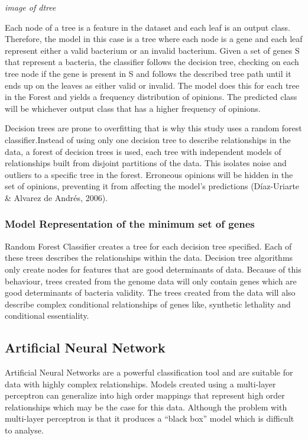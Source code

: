 \documentclass[]{report}
\begin{document}
\emph{image of dtree}

Each node of a tree is a feature in the dataset and each leaf is an
output class. Therefore, the model in this case is a tree where each
node is a gene and each leaf represent either a valid bacterium or an
invalid bacterium. Given a set of genes S that represent a bacteria, the
classifier follows the decision tree, checking on each tree node if the
gene is present in S and follows the described tree path until it ends
up on the leaves as either valid or invalid. The model does this for
each tree in the Forest and yields a frequency distribution of opinions.
The predicted class will be whichever output class that has a higher
frequency of opinions.

Decision trees are prone to overfitting that is why this study uses a
random forest classifier.Instead of using only one decision tree to
describe relationships in the data, a forest of decision trees is used,
each tree with independent models of relationships built from disjoint
partitions of the data. This isolates noise and outliers to a specific
tree in the forest. Erroneous opinions will be hidden in the set of
opinions, preventing it from affecting the model's predictions
(Díaz-Uriarte \& Alvarez de Andrés, 2006).

\subsubsection{Model Representation of the minimum set of
genes}\label{model-representation-of-the-minimum-set-of-genes}

Random Forest Classifier creates a tree for each decision tree
specified. Each of these trees describes the relationships within the
data. Decision tree algorithms only create nodes for features that are
good determinants of data. Because of this behaviour, trees created from
the genome data will only contain genes which are good determinants of
bacteria validity. The trees created from the data will also describe
complex conditional relationships of genes like, synthetic lethality and
conditional essentiality.

\subsection{Artificial Neural Network}\label{artificial-neural-network}

Artificial Neural Networks are a powerful classification tool and are
suitable for data with highly complex relationships. Models created
using a multi-layer perceptron can generalize into high order mappings
that represent high order relationships which may be the case for this
data. Although the problem with multi-layer perceptron is that it
produces a ``black box'' model which is difficult to analyse.
\end{document}

